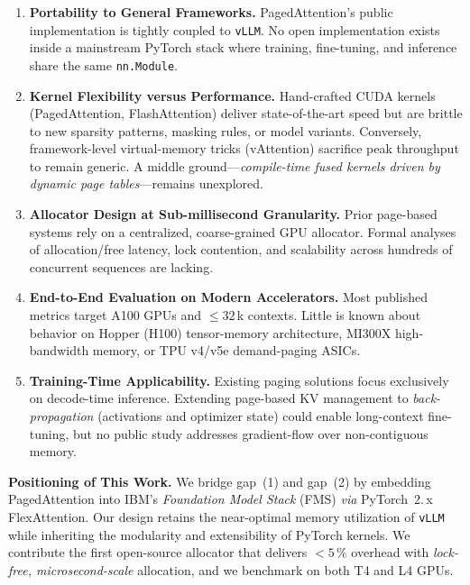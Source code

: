 \documentclass[conference]{IEEEtran}
\begin{document}
\begin{enumerate}[leftmargin=*]
    \item \textbf{Portability to General Frameworks.}  
    PagedAttention's public implementation is tightly coupled to \texttt{vLLM}.  
    No open implementation exists inside a mainstream PyTorch stack where training, fine-tuning, and inference share the same \texttt{nn.Module}.
    
    \item \textbf{Kernel Flexibility versus Performance.}  
    Hand-crafted CUDA kernels (PagedAttention, FlashAttention) deliver state-of-the-art speed but are brittle to new sparsity patterns, masking rules, or model variants.  
    Conversely, framework-level virtual-memory tricks (vAttention) sacrifice peak throughput to remain generic.  
    A middle ground—\emph{compile-time fused kernels driven by dynamic page tables}—remains unexplored.

    \item \textbf{Allocator Design at Sub-millisecond Granularity.}  
    Prior page-based systems rely on a centralized, coarse-grained GPU allocator.  
    Formal analyses of allocation/free latency, lock contention, and scalability across hundreds of concurrent sequences are lacking.

    \item \textbf{End-to-End Evaluation on Modern Accelerators.}  
    Most published metrics target A100 GPUs and $\le\!32$\,k contexts.  
    Little is known about behavior on Hopper (H100) tensor-memory architecture, MI300X high-bandwidth memory, or TPU v4/v5e demand-paging ASICs.

    \item \textbf{Training-Time Applicability.}  
    Existing paging solutions focus exclusively on decode-time inference.  
    Extending page-based KV management to \emph{back-propagation} (activations and optimizer state) could enable long-context fine-tuning, but no public study addresses gradient-flow over non-contiguous memory.
\end{enumerate}

\vspace{0.5em}
\noindent\textbf{Positioning of This Work.}
We bridge gap~(1) and gap~(2) by embedding PagedAttention into IBM's \textit{Foundation Model Stack} (FMS) \emph{via} PyTorch~2.\,x FlexAttention.  Our design retains the near-optimal memory utilization of \texttt{vLLM} while inheriting the modularity and extensibility of PyTorch kernels.  We contribute the first open-source allocator that delivers $<\!5\,\%$ overhead with \emph{lock-free, microsecond-scale} allocation, and we benchmark on both T4 and L4 GPUs.
\end{document}
